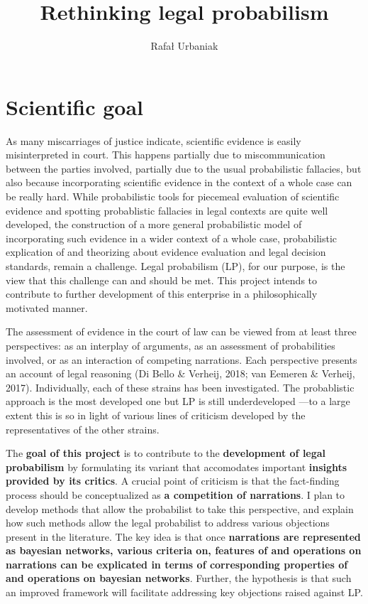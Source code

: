 \documentclass[11pt,dvipsnames,enabledeprecatedfontcommands]{scrartcl}
\title{Rethinking legal probabilism}
\author{Rafał Urbaniak}
\date{}
\begin{document}
\maketitle

\tableofcontents

\thispagestyle{empty}

\hypertarget{scientific-goal}{%
\section{Scientific goal}\label{scientific-goal}}

As many miscarriages of justice indicate, scientific evidence is easily
misinterpreted in court. This happens partially due to miscommunication
between the parties involved, partially due to the usual probabilistic
fallacies, but also because incorporating scientific evidence in the
context of a whole case can be really hard. While probabilistic tools
for piecemeal evaluation of scientific evidence and spotting
probablistic fallacies in legal contexts are quite well
developed,
the construction of a more general probabilistic model of incorporating
such evidence in a wider context of a whole case, probabilistic
explication of and theorizing about evidence evaluation and legal
decision standards, remain a challenge. Legal probabilism (LP), for our
purpose, is the view that this challenge can and should be met. This
project intends to contribute to further development of this enterprise
in a philosophically motivated manner.

The assessment of evidence in the court of law can be viewed from at
least three perspectives: as an interplay of arguments, as an assessment
of probabilities involved, or as an interaction of competing narrations.
Each perspective presents an account of legal reasoning (Di Bello \&
Verheij, 2018; van Eemeren \& Verheij, 2017). Individually, each of
these strains has been investigated. The probablistic approach is the
most developed one but LP is still underdeveloped ---to a large extent
this is so in light of various lines of criticism developed by the
representatives of the other strains.

The \textbf{goal of this project} is to contribute to the
\textbf{development of legal probabilism} by formulating its variant
that accomodates important \textbf{insights provided by its critics}. A
crucial point of criticism is that the fact-finding process should be
conceptualized as \textbf{a competition of narrations}. I plan to
develop methods that allow the probabilist to take this perspective, and
explain how such methods allow the legal probabilist to address various
objections present in the literature. The key idea is that once
\textbf{narrations are represented as bayesian networks, various criteria on,  features of  and operations on narrations can be explicated in terms of corresponding properties of and operations on bayesian networks}.
Further, the hypothesis is that such an improved framework will
facilitate addressing key objections raised against LP.
\end{document}
